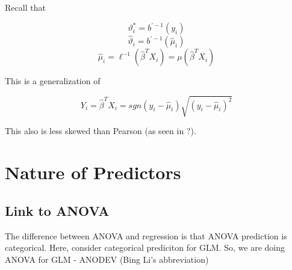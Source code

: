 \documentclass[11pt,fleqn]{book} %
\begin{document}
Recall that

		$$\vartheta^*_i = b^{'-1} (y_i) $$
		$$\hat{\vartheta}_i = b^{'-1} (\hat{\mu}_i) $$
		$$\hat{\mu}_i = \ell^{-1}(\hat{\beta}^T X_i) = \mu(\hat{\beta}^T X_i)$$

This is a generalization of 

		$$Y_i = \hat{\beta}^T X_i = sgn(y_i - \hat{\mu}_i)\sqrt{(y_i - \hat{\mu}_i)^2} $$

This also is less skewed than Pearson (as seen in  ?).








\chapter{Nature of Predictors}

\section{Link to ANOVA}

The difference between ANOVA and regression is that ANOVA prediction is categorical. Here, consider categorical prediciton for GLM. So, we are doing ANOVA for GLM - ANODEV (Bing Li's abbreviation) 
\end{document}
